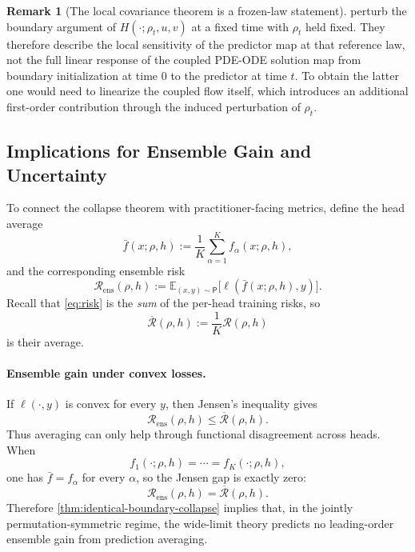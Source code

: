 \documentclass[11pt]{article}
\theoremstyle{definition}
\newtheorem{remark}[theorem]{Remark}
\newcommand{\E}{\mathbb{E}}
\begin{document}
\begin{remark}[The local covariance theorem is a frozen-law statement]
\label{rem:local-frozen-law}
 perturb the
boundary argument of $H(\cdot;\rho_t,u,v)$ at a fixed time with $\rho_t$ held
fixed. They therefore describe the local sensitivity of the predictor map at
that reference law, not the full linear response of the coupled PDE-ODE
solution map from boundary initialization at time $0$ to the predictor at time
$t$. To obtain the latter one would need to linearize the coupled flow itself,
which introduces an additional first-order contribution through the induced
perturbation of $\rho_t$.
\end{remark}

\subsection{Implications for Ensemble Gain and Uncertainty}
\label{sec:gain-uncertainty}

To connect the collapse theorem with practitioner-facing metrics, define the
head average
\[
  \bar f(x;\rho,h)
  :=
  \frac1K\sum_{\alpha=1}^K f_\alpha(x;\rho,h),
\]
and the corresponding ensemble risk
\[
  \mathcal R_{\mathrm{ens}}(\rho,h)
  :=
  \E_{(x,y)\sim\mathsf P}
  \bigl[\ell(\bar f(x;\rho,h),y)\bigr].
\]
Recall that \eqref{eq:risk} is the \emph{sum} of the per-head training risks, so
\[
  \overline{\mathcal R}(\rho,h):=\frac1K\mathcal R(\rho,h)
\]
is their average.

\paragraph{Ensemble gain under convex losses.}
If $\ell(\cdot,y)$ is convex for every $y$, then Jensen's inequality gives
\[
  \mathcal R_{\mathrm{ens}}(\rho,h)\le \overline{\mathcal R}(\rho,h).
\]
Thus averaging can only help through functional disagreement across heads. When
\[
  f_1(\cdot;\rho,h)=\cdots=f_K(\cdot;\rho,h),
\]
one has $\bar f=f_\alpha$ for every $\alpha$, so the Jensen gap is exactly zero:
\[
  \mathcal R_{\mathrm{ens}}(\rho,h)=\overline{\mathcal R}(\rho,h).
\]
Therefore \cref{thm:identical-boundary-collapse} implies that, in the jointly
permutation-symmetric regime, the wide-limit theory predicts no leading-order
ensemble gain from prediction averaging.
\end{document}
